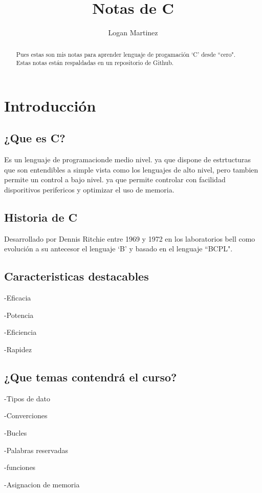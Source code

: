 \documentclass[]{article}
\title{Notas de C}
\author{Logan Martinez}
\begin{document}
	
	\maketitle
	
	\begin{abstract}
		Pues estas son mis notas para aprender lenguaje de progamación `C' desde ``cero". Estas notas están respaldadas en un repositorio de Github.
	\end{abstract}
	
	\section{Introducción}
	
	\subsection{¿Que es C?}
	Es un lenguaje de programacionde medio nivel. ya que dispone de estrtucturas que son entendibles a simple vista como los lenguajes de alto nivel, pero tambien permite un control a bajo nivel. ya que permite controlar con facilidad disporitivos perifericos y optimizar el uso de memoria.
	
	\subsection{Historia de C}
	Desarrollado por Dennis Ritchie entre 1969 y 1972 en los laboratorios bell como evolución a su antecesor el lenguaje `B' y basado en el lenguaje ``BCPL".
	
	\subsection{Caracteristicas destacables}
	-Eficacia
	
	-Potencia
	
	-Eficiencia
	
	-Rapidez
	
	\subsection{¿Que temas contendrá el curso?}
	-Tipos de dato
	
	-Converciones
	
	-Bucles
	
	-Palabras reservadas
	
	-funciones
	
	-Asignacion de memoria
	
\end{document}
